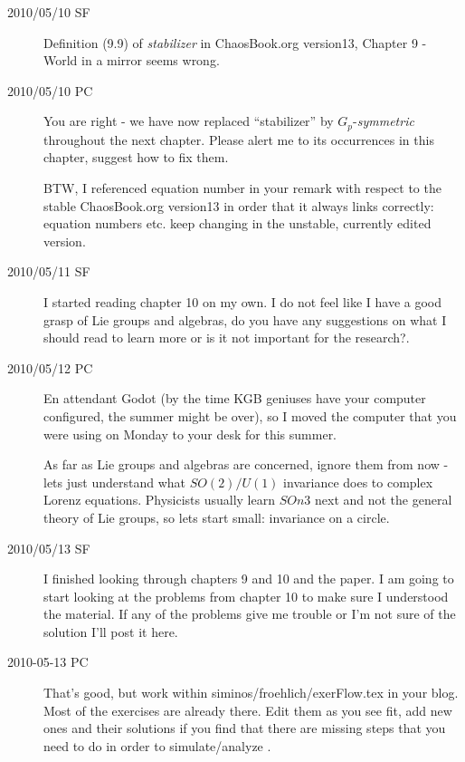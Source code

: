 \begin{description}
\item[2010/05/10 SF] Definition (9.9) of \emph{stabilizer}
in ChaosBook.org version13, 
{Chapter 9 - World in a mirror} seems wrong.

\item[2010/05/10 PC] You are right - we have now
{replaced ``stabilizer''} by $G_p$-\emph{symmetric} throughout the next chapter.
Please alert me to its occurrences in this chapter, suggest how to
fix them.

BTW, I referenced equation number in your remark with respect to
the stable ChaosBook.org version13 in order that it always links
 correctly: equation numbers etc. keep changing in the unstable,
 currently edited version.


\item[2010/05/11 SF] I started reading chapter 10 on my own.
I do not feel like I have a good grasp of Lie groups and algebras,
do you have any suggestions on what I should read to learn more
or is it not important for the research?.

\item[2010/05/12 PC] En attendant Godot (by the time KGB geniuses have
 your computer configured, the summer might be over), so I moved the
 computer that you were using on Monday to your desk for this summer.

As far as Lie groups and algebras are concerned, ignore them from now - lets
just understand what $SO(2) / U(1)$ invariance does to complex Lorenz equations.
Physicists usually learn $SOn{3}$ next and not the general theory of Lie groups, so lets
start small: invariance on a circle.

\item[2010/05/13 SF] I finished looking through chapters 9 and 10 and the paper. I am going to start looking at the problems from chapter 10 to make sure I understood the material. If any of the problems give me trouble or I'm not sure of the solution I'll post it here.

\item[2010-05-13 PC] That's good, but work within
siminos/froehlich/exerFlow.tex in your blog. Most of the exercises are
already there. Edit them as you see fit, add new ones and their solutions
 if you find that there are missing steps that you need to do in order
to simulate/analyze \cLe.


\end{description}

